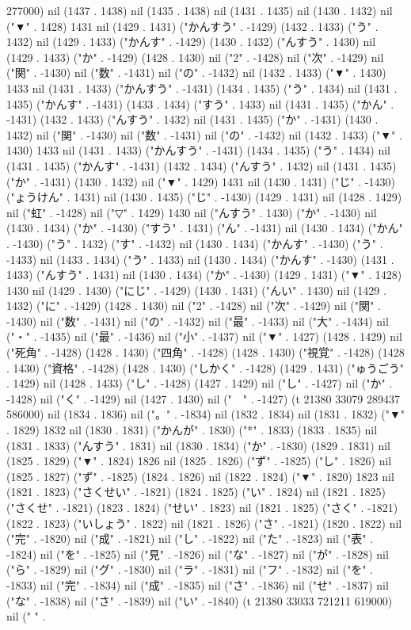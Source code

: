 277000) nil (1437 . 1438) nil (1435 . 1438) nil (1431 . 1435) nil (1430 . 1432) nil ("▼" . 1428) 1431 nil (1429 . 1431) ("かんすう" . -1429) (1432 . 1433) ("う" . 1432) nil (1429 . 1433) ("かんす" . -1429) (1430 . 1432) ("んすう" . 1430) nil (1429 . 1433) ("か" . -1429) (1428 . 1430) nil ("2" . -1428) nil ("次" . -1429) nil ("関" . -1430) nil ("数" . -1431) nil ("の" . -1432) nil (1432 . 1433) ("▼" . 1430) 1433 nil (1431 . 1433) ("かんすう" . -1431) (1434 . 1435) ("う" . 1434) nil (1431 . 1435) ("かんす" . -1431) (1433 . 1434) ("すう" . 1433) nil (1431 . 1435) ("かん" . -1431) (1432 . 1433) ("んすう" . 1432) nil (1431 . 1435) ("か" . -1431) (1430 . 1432) nil ("関" . -1430) nil ("数" . -1431) nil ("の" . -1432) nil (1432 . 1433) ("▼" . 1430) 1433 nil (1431 . 1433) ("かんすう" . -1431) (1434 . 1435) ("う" . 1434) nil (1431 . 1435) ("かんす" . -1431) (1432 . 1434) ("んすう" . 1432) nil (1431 . 1435) ("か" . -1431) (1430 . 1432) nil ("▼" . 1429) 1431 nil (1430 . 1431) ("じ" . -1430) ("ょうけん" . 1431) nil (1430 . 1435) ("じ" . -1430) (1429 . 1431) nil (1428 . 1429) nil ("虹" . -1428) nil ("▽" . 1429) 1430 nil ("んすう" . 1430) ("か" . -1430) nil (1430 . 1434) ("か" . -1430) ("すう" . 1431) ("ん" . -1431) nil (1430 . 1434) ("かん" . -1430) ("う" . 1432) ("す" . -1432) nil (1430 . 1434) ("かんす" . -1430) ("う" . -1433) nil (1433 . 1434) ("う" . 1433) nil (1430 . 1434) ("かんす" . -1430) (1431 . 1433) ("んすう" . 1431) nil (1430 . 1434) ("か" . -1430) (1429 . 1431) ("▼" . 1428) 1430 nil (1429 . 1430) ("にじ" . -1429) (1430 . 1431) ("んい" . 1430) nil (1429 . 1432) ("に" . -1429) (1428 . 1430) nil ("2" . -1428) nil ("次" . -1429) nil ("関" . -1430) nil ("数" . -1431) nil ("の" . -1432) nil ("最" . -1433) nil ("大" . -1434) nil ("・" . -1435) nil ("最" . -1436) nil ("小" . -1437) nil ("▼" . 1427) (1428 . 1429) nil ("死角" . -1428) (1428 . 1430) ("四角" . -1428) (1428 . 1430) ("視覚" . -1428) (1428 . 1430) ("資格" . -1428) (1428 . 1430) ("しかく" . -1428) (1429 . 1431) ("ゅうごう" . 1429) nil (1428 . 1433) ("し" . -1428) (1427 . 1429) nil ("し" . -1427) nil ("か" . -1428) nil ("く" . -1429) nil (1427 . 1430) nil ("　" . -1427) (t 21380 33079 289437 586000) nil (1834 . 1836) nil ("。" . -1834) nil (1832 . 1834) nil (1831 . 1832) ("▼" . 1829) 1832 nil (1830 . 1831) ("かんが" . 1830) ("*" . 1833) (1833 . 1835) nil (1831 . 1833) ("んすう" . 1831) nil (1830 . 1834) ("か" . -1830) (1829 . 1831) nil (1825 . 1829) ("▼" . 1824) 1826 nil (1825 . 1826) ("ず" . -1825) ("し" . 1826) nil (1825 . 1827) ("ず" . -1825) (1824 . 1826) nil (1822 . 1824) ("▼" . 1820) 1823 nil (1821 . 1823) ("さくせい" . -1821) (1824 . 1825) ("い" . 1824) nil (1821 . 1825) ("さくせ" . -1821) (1823 . 1824) ("せい" . 1823) nil (1821 . 1825) ("さく" . -1821) (1822 . 1823) ("いしょう" . 1822) nil (1821 . 1826) ("さ" . -1821) (1820 . 1822) nil ("完" . -1820) nil ("成" . -1821) nil ("し" . -1822) nil ("た" . -1823) nil ("表" . -1824) nil ("を" . -1825) nil ("見" . -1826) nil ("な" . -1827) nil ("が" . -1828) nil ("ら" . -1829) nil ("グ" . -1830) nil ("ラ" . -1831) nil ("フ" . -1832) nil ("を" . -1833) nil ("完" . -1834) nil ("成" . -1835) nil ("さ" . -1836) nil ("せ" . -1837) nil ("な" . -1838) nil ("さ" . -1839) nil ("い" . -1840) (t 21380 33033 721211 619000) nil (" " . 